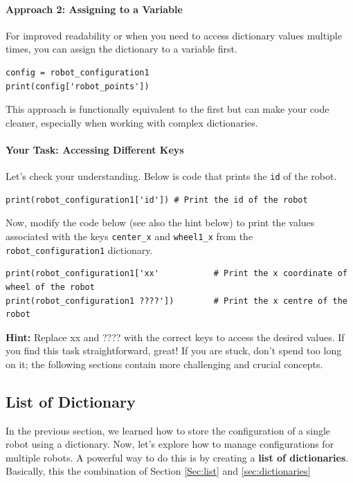 \paragraph*{Approach 2: Assigning to a Variable}

For improved readability or when you need to access dictionary values multiple times, you can assign the dictionary to a variable first.


\begin{verbatim}
config = robot_configuration1
print(config['robot_points'])
\end{verbatim}
This approach is functionally equivalent to the first but can make your code cleaner, especially when working with complex dictionaries.

\paragraph{Your Task:  Accessing Different Keys}
\label{par:task_accesing_diff_key}
Let's check your understanding. Below is code that prints the \texttt{id} of the robot.
\begin{verbatim}
print(robot_configuration1['id']) # Print the id of the robot
\end{verbatim}

Now, modify the code below (see also the hint below) to print the values associated with the keys \texttt{center\_x} and \texttt{wheel1\_x} from the \texttt{robot\_configuration1} dictionary.

\begin{verbatim}
print(robot_configuration1['xx'           # Print the x coordinate of wheel of the robot
print(robot_configuration1 ????'])        # Print the x centre of the robot
\end{verbatim}

\textbf{Hint:} Replace xx and ???? with the correct keys to access the desired values. If you find this task straightforward, great! If you are stuck, don't spend too long on it; the following sections contain more challenging and crucial concepts.

\subsection{List of Dictionary}

In the previous section, we learned how to store the configuration of a single robot using a dictionary. Now, let's explore how to manage configurations for multiple robots. A powerful way to do this is by creating a \textbf{list of dictionaries}. Basically, this the combination of Section \ref{Sec:list} and \ref{sec:dictionaries}


